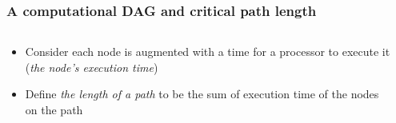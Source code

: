 \documentclass[12pt,dvipdfmx]{beamer}
\newcommand{\ao}[1]{{\color{blue}#1}}
\begin{document}
\begin{frame}[fragile]
\frametitle{A computational DAG and critical path length}
\begin{columns}[t]
\begin{column}{0.65\textwidth}
\begin{itemize}
\item Consider each node is augmented with a time
  for a processor to execute it 
  (\ao{\em the node's execution time})

\item Define {\em the length of a path} to be the
  sum of execution time of the nodes on the path
\end{itemize}

\end{column}

\begin{column}{0.35\textwidth}
\begin{center}

\end{center}
\end{column}
\end{columns}
\end{frame}
\end{document}
